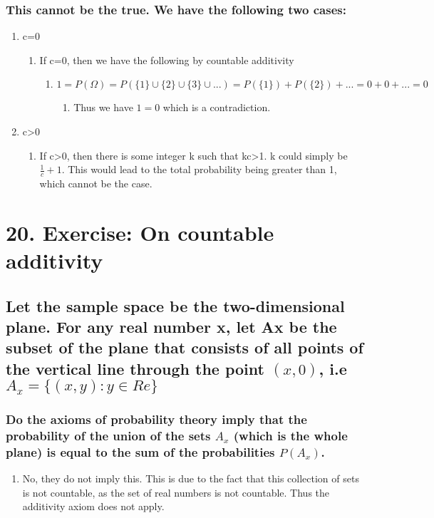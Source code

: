 \documentclass[11pt]{article}
\begin{document}
\subsubsection{This cannot be the true. We have the following two cases:}
\label{sec:org361519f}
\begin{enumerate}
\item c=0
\label{sec:orgafe41a4}
\begin{enumerate}
\item If c=0, then we have the following by countable additivity
\label{sec:org6e49e73}
\begin{enumerate}
\item \(1=P(\Omega )=P(\{1\}\cup \{2\}\cup \{3\}\cup ...) = P(\{1\}) + P(\{2\}) +... = 0+0+...=0\)
\label{sec:orgb41d519}
\begin{enumerate}
\item Thus we have \(1=0\) which is a contradiction.
\label{sec:org4ad4864}
\end{enumerate}
\end{enumerate}
\end{enumerate}
\item c>0
\label{sec:orga4c9334}
\begin{enumerate}
\item If c>0, then there is some integer k such that kc>1. k could simply be \(\frac{1}{c}+1\). This would lead to the total probability being greater than 1, which cannot be the case.
\label{sec:org2257812}
\end{enumerate}
\end{enumerate}
\section{20. Exercise: On countable additivity}
\label{sec:org3e48232}
\subsection{Let the sample space be the two-dimensional plane. For any real number x, let Ax be the subset of the plane that consists of all points of the vertical line through the point \((x,0)\), i.e \(A_x = \{\left( x,y \right): y \in Re\}\)}
\label{sec:orgf764f83}
\subsubsection{Do the axioms of probability theory imply that the probability of the union of the sets \(A_x\) (which is the whole plane) is equal to the sum of the probabilities \(P(A_x)\).}
\label{sec:orgbee8c2b}
\begin{enumerate}
\item No, they do not imply this. This is due to the fact that this collection of sets is not countable, as the set of real numbers is not countable. Thus the additivity axiom does not apply.
\label{sec:org459cb74}
\end{enumerate}
\end{document}
